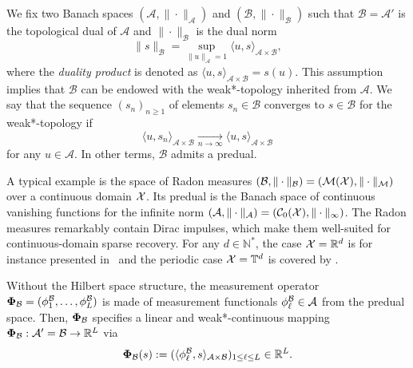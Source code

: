 \documentclass[12pt]{article}
\begin{document}
    We fix two Banach spaces $( \mathcal{A}, \| \cdot \|_{\mathcal{A}})$ and $( \mathcal{B}, \| \cdot \|_{\mathcal{B}})$ such that $\mathcal{B} = \mathcal{A}'$ is the topological dual of $\mathcal{A}$ and $\| \cdot \|_{\mathcal{B}}$ is the dual norm 
    \begin{equation*}
        \| s \|_{\mathcal{B}} = \sup_{\|u \|_{\mathcal{A}}=1} \langle u, s \rangle_{\mathcal{A}\times\mathcal{B}}, 
    \end{equation*}
    {where the \emph{duality product} is denoted as $\langle u, s \rangle_{\mathcal{A}\times\mathcal{B}} = s(u)$.}
    This assumption implies that $\mathcal{B}$ can be endowed with the weak*-topology inherited from $\mathcal{A}$. We say that the sequence $(s_n)_{n\geq 1}$ of elements $s_n \in \mathcal{B}$ converges to $s \in \mathcal{B}$ for the weak*-topology if 
    \begin{equation*}
        \langle u , s_n \rangle_{\mathcal{A}\times\mathcal{B}} \underset{n\rightarrow \infty}{\longrightarrow} \langle u, s \rangle_{\mathcal{A}\times\mathcal{B}} 
    \end{equation*}
    for any $u \in \mathcal{A}$.
    In other terms, $\mathcal{B}$ admits a predual\footnotemark.

    A typical example is the space of Radon measures $(\mathcal{B}, \|\cdot \|_{\mathcal{B}}) = ({\mathcal{M}}({\mathcal{X}}), \|\cdot \|_{\mathcal{M}})$ over a continuous domain $\mathcal{X}$. Its predual is the Banach space of continuous vanishing functions for the infinite norm $(\mathcal{A}, \|\cdot \|_{\mathcal{A}}) =({\mathcal{C}}_0({\mathcal{X}}), \| \cdot \|_{\infty})$. The Radon measures remarkably contain Dirac impulses, which make them well-suited for continuous-domain sparse recovery. For any $d\in\mathbb{N}^*$, the case $\mathcal{X}=\mathbb{R}^d$ is for instance presented in~\cite{unser2017splines,Unser2020} and the periodic case $\mathcal{X}=\mathbb{T}^d$ is covered by \cite{fageot2020tv}.

    Without the Hilbert space structure, the measurement operator ${\bm{\Phi}_\mathcal{B}}= (\phi^\mathcal{B}_1, \ldots, \phi^\mathcal{B}_L)$ is made of measurement functionals $\phi_\ell^{\mathcal{B}} \in \mathcal{A}$ from the predual space. Then, ${\bm{\Phi}_\mathcal{B}}$ specifies a linear and weak*-continuous mapping ${\bm{\Phi}_\mathcal{B}}: \mathcal{A}' =\mathcal{B} \rightarrow \mathbb{R}^L$ via 
    \begin{equation}
        \label{eq:phi-banach}
        {\bm{\Phi}_\mathcal{B}} (s) := (\langle \phi_\ell^{\mathcal{B}}, s \rangle_{\mathcal{A}\times\mathcal{B}})_{1\leq \ell \leq L} \in \mathbb{R}^L.
    \end{equation}
\end{document}

